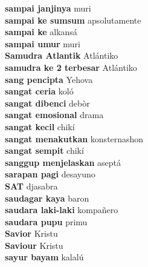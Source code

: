 \textbf{ sampai janjinya  } muri \\
\textbf{ sampai ke sumsum  } apsolutamente \\
\textbf{ sampai ke  } alkansá \\
\textbf{ sampai umur  } muri \\
\textbf{ Samudra Atlantik  } Atlántiko \\
\textbf{ samudra ke 2 terbesar  } Atlántiko \\
\textbf{ sang pencipta  } Yehova \\
\textbf{ sangat ceria  } koló \\
\textbf{ sangat dibenci  } debòr \\
\textbf{ sangat emosional  } drama \\
\textbf{ sangat kecil  } chikí \\
\textbf{ sangat menakutkan  } konsternashon \\
\textbf{ sangat sempit  } chikí \\
\textbf{ sanggup menjelaskan  } aseptá \\
\textbf{ sarapan pagi  } desayuno \\
\textbf{ SAT  } djasabra \\
\textbf{ saudagar kaya  } baron \\
\textbf{ saudara laki-laki  } kompañero \\
\textbf{ saudara pupu  } primu \\
\textbf{ Savior  } Kristu \\
\textbf{ Saviour  } Kristu \\
\textbf{ sayur bayam  } kalalú \\
